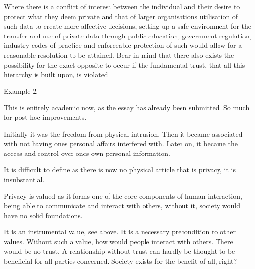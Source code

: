 
Where there is a conflict of interest between the individual and their desire to protect what they deem private and that of larger organisations utilisation of such data to create more affective decisions, setting up a safe environment for the transfer and use of private data through public education, government regulation, industry codes of practice and enforceable protection of such would allow for a reasonable resolution to be attained. Bear in mind that there also exists the possibility for the exact opposite to occur if the fundamental trust, that all this hierarchy is built upon, is violated. 



Example 2.


This is entirely academic now, as the essay has already been submitted. So much for post-hoc improvements.



Initially it was the freedom from physical intrusion. Then it became associated with not having ones personal affairs interfered with. Later on, it became the access and control over ones own personal information.

It is difficult to define as there is now no physical article that is privacy, it is insubstantial.


Privacy is valued as it forms one of the core components of human interaction, being able to communicate and interact with others, without it, society would have no solid foundations.

It is an instrumental value, see above. It is a necessary precondition to other values. Without such a value, how would people interact with others. There would
be no trust. A relationship without trust can hardly be thought to be beneficial for all parties concerned. Society exists for the benefit of all, right?


